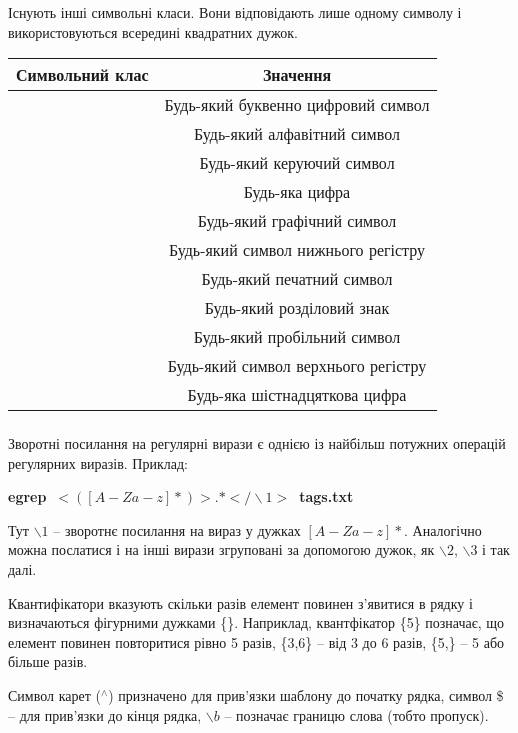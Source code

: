 \documentclass[t]{beamer}  %
\begin{document}
\begin{frame}
  \frametitle{\insertsection} 
	\framesubtitle{\insertsubsection}
	Існують інші символьні класи. Вони відповідають лише одному символу і використовуються всередині квадратних дужок.
	\begin{table}
	  \label{tab:}
	
	  \begin{center}
	    \begin{tabular}{|c|c|}
	    \hline
	      {\bf Символьний клас} & {\bf Значення} \\
	       \hline
	       [:alnum:] & Будь-який буквенно цифровий символ\\
	       \hline
	       [:alpha:] & Будь-який алфавітний символ\\
	       \hline
	       [:cntrl:] & Будь-який керуючий символ\\
	       \hline
	       [:digit:] & Будь-яка цифра\\
	       \hline
	       [:graph:] & Будь-який графічний символ\\
	       \hline
	       [:lower:] & Будь-який символ нижнього регістру\\
	       \hline
	       [:print:] & Будь-який печатний символ\\
	       \hline
	       [:punct:] & Будь-який розділовий знак\\
	       \hline
	       [:space:] & Будь-який пробільний символ\\
	       \hline
	       [:upper:] & Будь-який символ верхнього регістру\\
	       \hline
	       [:xdigit:] & Будь-яка шістнадцяткова цифра\\
	       \hline
	    \end{tabular}
	  \end{center}
	\end{table}
	
\end{frame}

\begin{frame}
  \frametitle{\insertsection} 
	\framesubtitle{\insertsubsection}
Зворотні посилання на регулярні вирази є однією із найбільш потужних операцій регулярних виразів. Приклад:

\textbf{egrep~\textquotesingle$<([A-Za-z]*)>.*</\backslash1>$\textquotesingle~tags.txt}

Тут $\backslash1$ -- зворотнє посилання на вираз у дужках $[A-Za-z]*$. Аналогічно можна послатися і на інші вирази згруповані за допомогою дужок, як $\backslash2$, $\backslash3$ і так далі.

Квантифікатори вказують скільки разів елемент повинен з'явитися в рядку і визначаються фігурними дужками \{\}. Наприклад, квантфікатор \{5\} позначає, що елемент повинен повторитися рівно 5 разів, \{3,6\} -- від 3 до 6 разів, \{5,\} -- 5 або більше разів.

Символ карет (${}^{\wedge}$) призначено для прив'язки шаблону до початку рядка, символ \$ -- для прив'язки до кінця рядка, $\backslash b$ -- позначає границю слова (тобто пропуск).
\end{frame}
\end{document}
